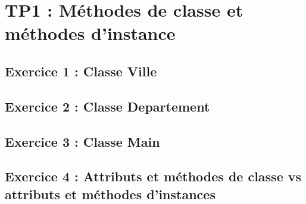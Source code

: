 \chapter{TP1 : Méthodes de classe et méthodes d'instance}

\section{Exercice 1 : Classe Ville}

\section{Exercice 2 : Classe Departement}

\section{Exercice 3 : Classe Main}

\section{Exercice 4 : Attributs et méthodes de classe vs attributs et méthodes d'instances}
